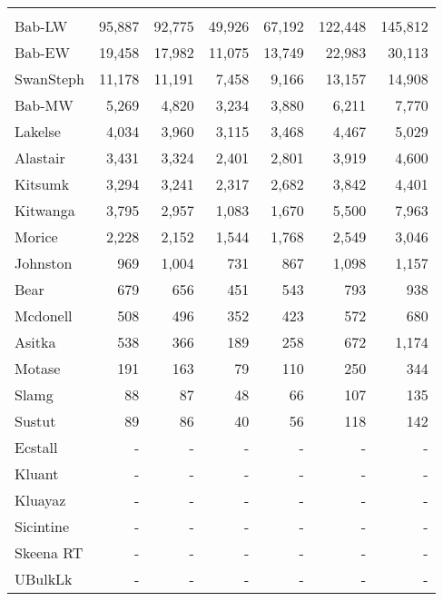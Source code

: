 \documentclass[french,11pt]{book}
\begin{document}
\begin{longtable}[t]{lrrrrrr}
\midrule\\ Bab-LW & 95,887 & 92,775 & 49,926 & 67,192 & 122,448 & 145,812\\ Bab-EW & 19,458 & 17,982 & 11,075 & 13,749 & 22,983 & 30,113\\ SwanSteph & 11,178 & 11,191 & 7,458 & 9,166 & 13,157 & 14,908\\ Bab-MW & 5,269 & 4,820 & 3,234 & 3,880 & 6,211 & 7,770\\ Lakelse & 4,034 & 3,960 & 3,115 & 3,468 & 4,467 & 5,029\\ Alastair & 3,431 & 3,324 & 2,401 & 2,801 & 3,919 & 4,600\\ Kitsumk & 3,294 & 3,241 & 2,317 & 2,682 & 3,842 & 4,401\\ Kitwanga & 3,795 & 2,957 & 1,083 & 1,670 & 5,500 & 7,963\\ Morice & 2,228 & 2,152 & 1,544 & 1,768 & 2,549 & 3,046\\ Johnston & 969 & 1,004 & 731 & 867 & 1,098 & 1,157\\ Bear & 679 & 656 & 451 & 543 & 793 & 938\\ Mcdonell & 508 & 496 & 352 & 423 & 572 & 680\\ Asitka & 538 & 366 & 189 & 258 & 672 & 1,174\\ Motase & 191 & 163 & 79 & 110 & 250 & 344\\ Slamg & 88 & 87 & 48 & 66 & 107 & 135\\ Sustut & 89 & 86 & 40 & 56 & 118 & 142\\ Ecstall & - & - & - & - & - & -\\ Kluant & - & - & - & - & - & -\\ Kluayaz & - & - & - & - & - & -\\ Sicintine & - & - & - & - & - & -\\ Skeena RT & - & - & - & - & - & -\\ UBulkLk & - & - & - & - & - & -\\* \end{longtable}

\endgroup{} \endgroup{}

\clearpage
\end{document}
